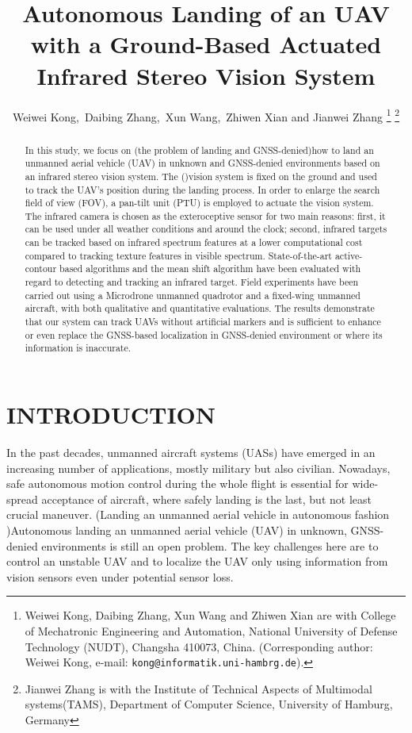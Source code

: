 \documentclass[letterpaper, 10 pt, conference]{ieeeconf}  %
\title{\LARGE \bf
Autonomous Landing of an UAV with a Ground-Based Actuated Infrared Stereo Vision System}
\author{Weiwei Kong,\ Daibing Zhang,\ Xun Wang,\ Zhiwen Xian and Jianwei Zhang%
\thanks{Weiwei Kong, Daibing Zhang, Xun Wang and Zhiwen Xian are with College of Mechatronic Engineering and Automation, National University of Defense Technology (NUDT), Changsha 410073, China. (Corresponding author: Weiwei Kong, e-mail:  {\tt\small kong@informatik.uni-hambrg.de}).
       }%
\thanks{Jianwei Zhang is with the Institute of Technical Aspects of Multimodal systems(TAMS), Department of Computer Science, University of Hamburg, Germany}%
}
\begin{document}
\maketitle
\thispagestyle{empty}
\pagestyle{empty}

\begin{abstract}

In this study, we focus on (the problem of landing and GNSS-denied)how to land an unmanned aerial vehicle (UAV) in unknown and GNSS-denied environments based on an infrared stereo vision system. The ()vision system is fixed on the ground and used to track the UAV's position during the landing process. In order to enlarge the search field of view (FOV), a pan-tilt unit (PTU) is employed to actuate the vision system. The infrared camera is chosen as the exteroceptive sensor for two main reasons: first, it can be used under all weather conditions and around the clock; second, infrared targets can be tracked based on infrared spectrum features at a lower computational cost compared to tracking texture features in visible spectrum. State-of-the-art active-contour based algorithms and the mean shift algorithm have been evaluated with regard to detecting and tracking an infrared target. Field experiments have been carried out using a Microdrone unmanned quadrotor and a fixed-wing unmanned aircraft, with both qualitative and quantitative evaluations. The results demonstrate that our system can track UAVs without artificial markers and is sufficient to enhance or even replace the GNSS-based localization in GNSS-denied environment or where its information is inaccurate.

\end{abstract}


\section{INTRODUCTION}

In the past decades, unmanned aircraft systems (UASs) have emerged in an increasing number of applications, mostly military but also civilian. Nowadays, safe autonomous motion control during the whole flight is essential for wide-spread acceptance of aircraft, where safely landing is the last, but not least crucial maneuver. (Landing an unmanned aerial vehicle in autonomous fashion )Autonomous landing an unmanned aerial vehicle (UAV) in unknown, GNSS-denied environments is still an open problem. The key challenges here are to control an unstable UAV and to localize the UAV only using information from vision sensors even under potential sensor loss.
\end{document}
